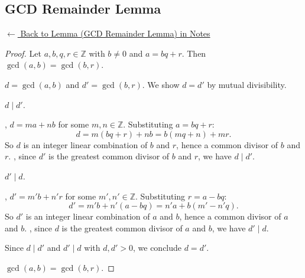 
\subsection*{GCD Remainder Lemma}
\label{prf:gcd-remainder}

\begin{remark*}[Return]
\hyperref[lem:gcd-remainder]{$\leftarrow$ Back to Lemma (GCD Remainder Lemma) in Notes}
\end{remark*}

\begin{proof}
\Claim Let $a, b, q, r \in \mathbb{Z}$ with $b \neq 0$ and $a = bq + r$.
Then $\gcd(a,b) = \gcd(b,r)$.

\Let $d = \gcd(a,b)$ and $d' = \gcd(b,r)$.
\Strategy We show $d = d'$ by mutual divisibility.

\medskip
\noindent\textit{$d \mid d'$.}

, $d = ma + nb$ for some $m, n \in \mathbb{Z}$.
Substituting $a = bq + r$:
\[
    d = m(bq + r) + nb = b(mq + n) + mr.
\]
So $d$ is an integer linear combination of $b$ and $r$, hence a common
divisor of $b$ and $r$.
, since $d'$ is the greatest common divisor
of $b$ and $r$, we have $d \mid d'$.

\medskip
\noindent\textit{$d' \mid d$.}

, $d' = m'b + n'r$ for some $m', n' \in \mathbb{Z}$.
Substituting $r = a - bq$:
\[
    d' = m'b + n'(a - bq) = n'a + b(m' - n'q).
\]
So $d'$ is an integer linear combination of $a$ and $b$, hence a common
divisor of $a$ and $b$.
, since $d$ is the greatest common divisor
of $a$ and $b$, we have $d' \mid d$.

\medskip
Since $d \mid d'$ and $d' \mid d$ with $d, d' > 0$, we conclude $d = d'$.

\Hence $\gcd(a,b) = \gcd(b,r)$. \AsReq
\end{proof}

